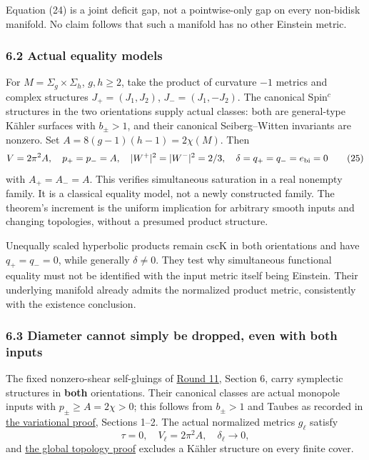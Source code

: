 \documentclass[
  11pt,
]{article}
\begin{document}
Equation (24) is a joint deficit gap, not a pointwise-only gap on every
non-bidisk manifold. No claim follows that such a manifold has no other
Einstein metric.

\hypertarget{actual-equality-models}{%
\subsubsection{6.2 Actual equality
models}\label{actual-equality-models}}

For \(M=\Sigma_g\times\Sigma_h\), \(g,h\ge2\), take the product of
curvature \(-1\) metrics and complex structures \(J_+=(J_1,J_2)\),
\(J_-=(J_1,-J_2)\). The canonical Spin\(^c\) structures in the two
orientations supply actual classes: both are general-type Kähler
surfaces with \(b_\pm>1\), and their canonical Seiberg--Witten
invariants are nonzero. Set \(A=8(g-1)(h-1)=2\chi(M)\). Then \[
 V=2\pi^2A,\quad p_+=p_-=A,
 \quad |W^+|^2=|W^-|^2=2/3,
 \quad \delta=q_+=q_-=e_{\rm bi}=0
 \tag{25}
\] with \(A_+=A_-=A\). This verifies simultaneous saturation in a real
nonempty family. It is a classical equality model, not a newly
constructed family. The theorem's increment is the uniform implication
for arbitrary smooth inputs and changing topologies, without a presumed
product structure.

Unequally scaled hyperbolic products remain cscK in both orientations
and have \(q_+=q_-=0\), while generally \(\delta\ne0\). They test why
simultaneous functional equality must not be identified with the input
metric itself being Einstein. Their underlying manifold already admits
the normalized product metric, consistently with the existence
conclusion.

\hypertarget{diameter-cannot-simply-be-dropped-even-with-both-inputs}{%
\subsubsection{6.3 Diameter cannot simply be dropped, even with both
inputs}\label{diameter-cannot-simply-be-dropped-even-with-both-inputs}}

The fixed nonzero-shear self-gluings of
\href{../mathematics/current/round11_closed_gluing.md}{Round 11},
Section 6, carry symplectic structures in \textbf{both} orientations.
Their canonical classes are actual monopole inputs with
\(p_\pm\ge A=2\chi>0\); this follows from \(b_\pm>1\) and Taubes as
recorded in \href{../mathematics/current/round11_variational.md}{the
variational proof}, Sections 1--2. The actual normalized metrics
\(g_\ell\) satisfy \[
 \tau=0,\quad V_\ell=2\pi^2A,\quad
 \delta_\ell\to0,
 \tag{26}
\] and \href{../mathematics/current/round11_kahler.md}{the global
topology proof} excludes a Kähler structure on every finite cover.
\end{document}
